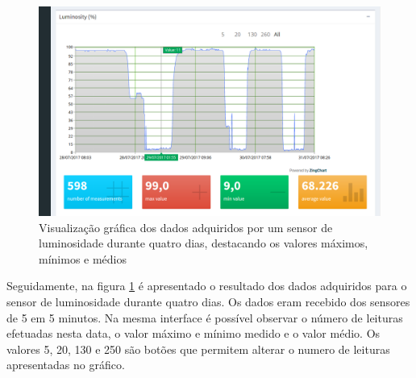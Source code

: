 \newpage

\begin{figure}[h]
	\centering
	\includegraphics[width=0.8\linewidth]{prints-web/humidity.png}
	\caption{Visualização gráfica dos dados adquiridos por um sensor de luminosidade durante quatro dias, destacando os valores máximos, mínimos e médios}
	\label{grafico_humidade}
\end{figure}





Seguidamente, na figura \ref{grafico_humidade} é apresentado o resultado dos dados adquiridos para o sensor de luminosidade durante quatro dias. Os dados eram recebido dos sensores de 5 em 5 minutos. Na mesma interface é possível observar o número de leituras efetuadas nesta data, o valor máximo e mínimo medido e o valor médio. Os valores 5, 20, 130 e 250 são botões que permitem alterar o numero de leituras apresentadas no gráfico. 
 

